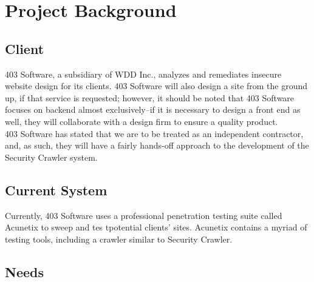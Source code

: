 \section{Project Background}
\subsection{Client}
	403 Software, a subsidiary of WDD Inc., analyzes and remediates insecure website design for its clients.  403 Software will also design a site from the ground up, if that service is requested; however, it should be noted that 403 Software focuses on backend almost exclusively--if it is necessary to design a front end as well, they will collaborate with a design firm to ensure a quality product. \\
403 Software has stated that we are to be treated as an independent contractor, and, as such, they will have a fairly hands-off approach to the development of the Security Crawler system.

\subsection{Current System}

	Currently, 403 Software uses a professional penetration testing suite called Acunetix to sweep and tes tpotential clients' sites.  Acunetix contains a myriad of testing tools, including a crawler similar to Security Crawler.

\subsection{Needs}

